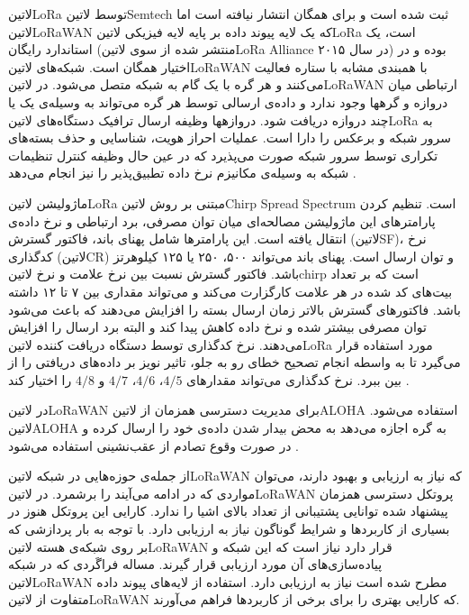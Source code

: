 ‌لاتین{LoRa} توسط ‌لاتین{Semtech} ثبت شده است و برای همگان انتشار نیافته است اما ‌لاتین{LoRaWAN} که یک لایه پیوند داده بر پایه لایه فیزیکی ‌لاتین{LoRa}
است، یک استاندارد رایگان (منتشر شده از سوی ‌لاتین{LoRa Alliance} در سال ۲۰۱۵) بوده و در اختیار همگان است.
شبکه‌های ‌لاتین{LoRaWAN} با همبندی مشابه با ستاره فعالیت می‌کنند و هر گره با یک گام به شبکه متصل می‌شود.
در ‌لاتین{LoRaWAN} ارتباطی میان دروازه و گرهها وجود ندارد و داده‌ی ارسالی توسط هر گره می‌تواند به وسیله‌ی یک یا چند دروازه دریافت شود.
دروازهها وظیفه ارسال ترافیک دستگاه‌های ‌لاتین{LoRa} به سرور شبکه و برعکس را دارا است.
عملیات احراز هویت، شناسایی و حذف بسته‌های تکراری توسط سرور شبکه صورت می‌پذیرد که در عین حال وظیفه کنترل
تنظیمات شبکه به وسیله‌ی مکانیزم نرخ داده تطبیق‌پذیر را نیز انجام می‌دهد .

ماژولیشن ‌لاتین{LoRa} مبتنی بر روش ‌لاتین{Chirp Spread Spectrum} است. تنظیم کردن پارامترهای این ماژولیشن
مصالحه‌ای میان توان مصرفی، برد ارتباطی و نرخ داده‌ی انتقال یافته است.
این پارامترها شامل پهنای باند، فاکتور گسترش (‌لاتین{SF})، نرخ کدگذاری (‌لاتین{CR}) و توان ارسال است.
پهنای باند می‌تواند ۵۰۰، ۲۵۰ یا ۱۲۵ کیلوهرتز باشد.
فاکتور گسترش نسبت بین نرخ علامت و نرخ ‌لاتین{chirp} است که بر تعداد بیت‌های کد شده در هر علامت کارگزارت می‌کند و می‌تواند مقداری بین ۷ تا ۱۲ داشته باشد.
فاکتورهای گسترش بالاتر زمان ارسال بسته را افزایش می‌دهند که باعث می‌شود توان مصرفی بیشتر شده و نرخ داده کاهش پیدا کند و البته برد ارسال را افزایش می‌دهند.
نرخ کدگذاری توسط دستگاه دریافت کننده ‌لاتین{LoRa} مورد استفاده قرار می‌گیرد تا به واسطه انجام تصحیح خطای رو به جلو، تاثیر نویز بر داده‌های دریافتی را از بین ببرد.
نرخ کدگذاری می‌تواند مقدارهای $4/5$، $4/6$، $4/7$ و $4/8$ را اختیار کند
.

در ‌لاتین{LoRaWAN} برای مدیریت دسترسی همزمان از ‌لاتین{ALOHA} استفاده می‌شود.
‌لاتین{ALOHA} به گره اجازه می‌دهد به محض بیدار شدن داده‌ی خود را ارسال کرده و در صورت وقوع تصادم
از عقب‌نشینی استفاده می‌شود
.

از جمله‌ی حوزه‌هایی در شبکه ‌لاتین{LoRaWAN} که نیاز به ارزیابی و بهبود دارند، می‌توان مواردی که در ادامه می‌آیند را برشمرد.
در ‌لاتین{LoRaWAN} پروتکل دسترسی همزمان پیشنهاد شده توانایی پشتیبانی از تعداد بالای اشیا را ندارد. کارایی این پروتکل هنوز در بسیاری از کاربردها
و شرایط گوناگون نیاز به ارزیابی دارد. با توجه به بار پردازشی که بر روی شبکه‌ی هسته ‌لاتین{LoRaWAN} قرار دارد نیاز است که این شبکه و پیاده‌سازی‌های آن
مورد ارزیابی قرار گیرند. مساله فراگَردی که در شبکه ‌لاتین{LoRaWAN} مطرح شده است نیاز به ارزیابی دارد.
استفاده از لایه‌های پیوند داده متفاوت از ‌لاتین{LoRaWAN} که کارایی بهتری را برای برخی از کاربردها فراهم می‌آورند.

